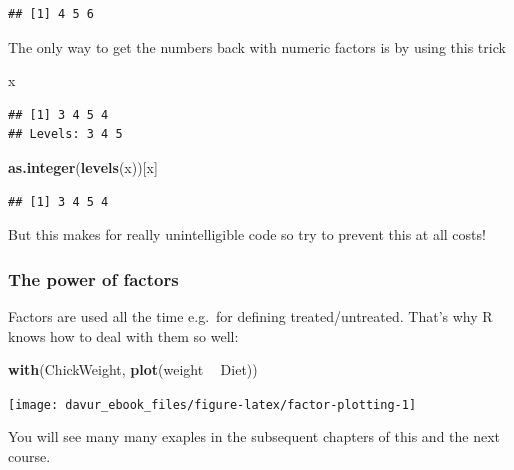 \documentclass[]{book}
\newenvironment{Shaded}{\begin{snugshade}}{\end{snugshade}}
\newcommand{\KeywordTok}[1]{\textcolor[rgb]{0.13,0.29,0.53}{\textbf{#1}}}
\newcommand{\NormalTok}[1]{#1}
\newcommand{\OperatorTok}[1]{\textcolor[rgb]{0.81,0.36,0.00}{\textbf{#1}}}
\newcommand{\StringTok}[1]{\textcolor[rgb]{0.31,0.60,0.02}{#1}}
\begin{document}
\begin{verbatim}
## [1] 4 5 6
\end{verbatim}

The only way to get the numbers back with numeric factors is by using this trick

\begin{Shaded}
\begin{Highlighting}[]
\NormalTok{x}
\end{Highlighting}
\end{Shaded}

\begin{verbatim}
## [1] 3 4 5 4
## Levels: 3 4 5
\end{verbatim}

\begin{Shaded}
\begin{Highlighting}[]
\KeywordTok{as.integer}\NormalTok{(}\KeywordTok{levels}\NormalTok{(x))[x]}
\end{Highlighting}
\end{Shaded}

\begin{verbatim}
## [1] 3 4 5 4
\end{verbatim}

But this makes for really unintelligible code so try to prevent this at all costs!

\hypertarget{the-power-of-factors}{%
\subsubsection*{The power of factors}\label{the-power-of-factors}}

Factors are used all the time e.g.~for defining treated/untreated. That's why R knows how to deal with them so well:

\begin{Shaded}
\begin{Highlighting}[]
\KeywordTok{with}\NormalTok{(ChickWeight, }\KeywordTok{plot}\NormalTok{(weight }\OperatorTok{~}\StringTok{ }\NormalTok{Diet))}
\end{Highlighting}
\end{Shaded}

\begin{center}\texttt{[image: davur\_ebook\_files/figure-latex/factor-plotting-1]} \end{center}

You will see many many exaples in the subsequent chapters of this and the next course.
\end{document}
